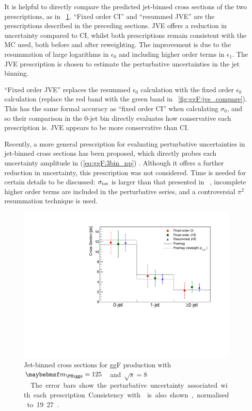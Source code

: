 It is helpful to directly compare the predicted jet-binned cross sections of the two 
prescriptions, as in \Figure~\ref{fig:signal:jetbin_xs_summary}. ``Fixed order CI'' and 
``resummed JVE'' are the prescriptions described in the preceding sections. JVE offers a 
reduction in uncertainty compared to CI, whilst both prescriptions remain consistent with 
the  MC used, both before and after \ptH reweighting. The 
improvement is due to the resummation of large logarithms in $\epsilon_0$ and including 
higher order terms in $\epsilon_1$. The JVE prescription is chosen to estimate the 
perturbative uncertainties in the jet binning.

``Fixed order JVE'' replaces the resummed $\epsilon_0$ calculation with the fixed order 
$\epsilon_0$ calculation (\ie replace the red band with the green band in 
\Figure~\ref{fig:ggF:jve_compare}). This has the same formal accuracy as ``fixed order CI'' 
when calculating $\sigma_0$, and so their comparison in the 0-jet bin directly evaluates 
how conservative each prescription is. JVE appears to be more conservative than CI.

Recently, a more general prescription for evaluating perturbative uncertainties in 
jet-binned cross sections has been proposed, which directly probes each uncertainty 
amplitude in (\ref{eq:ggF:3bin_np}) \cite{BLTPW:2013}. Although it offers a further 
reduction in uncertainty, this prescription was not considered. Time is needed for certain 
details to be discussed: $\sigma_{\text{tot}}$ is larger than that presented in 
\Reference~\cite{YR3}, incomplete higher order terms are included in the perturbative 
series, and a controversial $\pi^2$ resummation technique is used.

\begin{figure}[t]
	\includegraphics[width=\largefigwidth]{custom_images/ggF_xs_jetbin}
	\caption{Jet-binned cross sections for ggF production with \unit{$\mH = 125$}{\GeV} and 
	\unit{$\sqrt{s} = 8$}{\TeV}. The error bars show the perturbative uncertainty 
	associated with each prescription. Consistency with  is also shown, normalised to \unit{19.27}{\pico\barn}.}
	\label{fig:signal:jetbin_xs_summary}
\end{figure}
